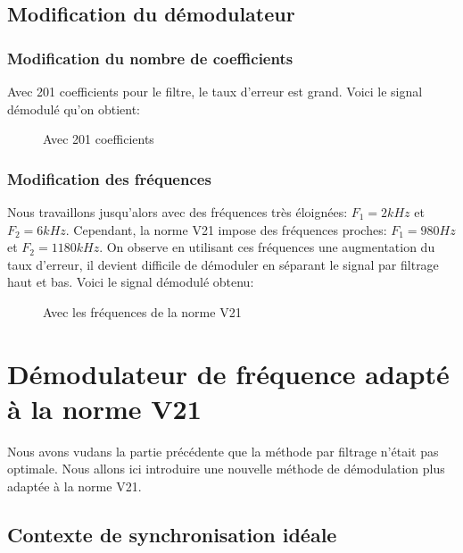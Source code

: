 \documentclass{article}
\begin{document}
\subsection{Modification du démodulateur} 

\subsubsection{Modification du nombre de coefficients}

Avec 201 coefficients pour le filtre, le taux d'erreur est grand.
Voici le signal démodulé qu'on obtient:

\begin{figure}[H]
	\centering
	
	\caption{Avec 201 coefficients}
	\label{fig:201-coefficients}
\end{figure}

\subsubsection{Modification des fréquences}

Nous travaillons jusqu'alors avec des fréquences très éloignées: $F_1=2kHz$ et $F_2=6kHz$. Cependant, la norme V21 impose des fréquences proches: $F_1=980Hz$ et $F_2=1180kHz$. On observe en utilisant ces fréquences une augmentation du taux d'erreur, il devient difficile de démoduler en séparant le signal par filtrage haut et bas.
Voici le signal démodulé obtenu:

\begin{figure}[H]
	\centering
	
	\caption{Avec les fréquences de la norme V21}
	\label{fig:filtrage-avec-v21}
\end{figure}

\section{Démodulateur de fréquence adapté à la norme V21}

Nous avons vudans la partie précédente que la méthode par filtrage n'était pas optimale. Nous allons ici introduire une nouvelle méthode de démodulation plus adaptée à la norme V21.

\subsection{Contexte de synchronisation idéale}
\label{synchro-ideale}
\end{document}
